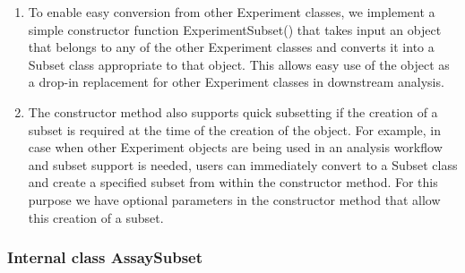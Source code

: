 \documentclass[
]{article}
\providecommand{\tightlist}{%
  \setlength{\itemsep}{0pt}\setlength{\parskip}{0pt}}
\begin{document}
\begin{enumerate}
\def\labelenumi{\arabic{enumi}.}
\tightlist
\item
  To enable easy conversion from other Experiment classes, we implement
  a simple constructor function ExperimentSubset() that takes input an
  object that belongs to any of the other Experiment classes and
  converts it into a Subset class appropriate to that object. This
  allows easy use of the object as a drop-in replacement for other
  Experiment classes in downstream analysis.
\item
  The constructor method also supports quick subsetting if the creation
  of a subset is required at the time of the creation of the object. For
  example, in case when other Experiment objects are being used in an
  analysis workflow and subset support is needed, users can immediately
  convert to a Subset class and create a specified subset from within
  the constructor method. For this purpose we have optional parameters
  in the constructor method that allow this creation of a subset.
\end{enumerate}

\hypertarget{internal-class-assaysubset}{%
\subsubsection{Internal class
AssaySubset}\label{internal-class-assaysubset}}
\end{document}
